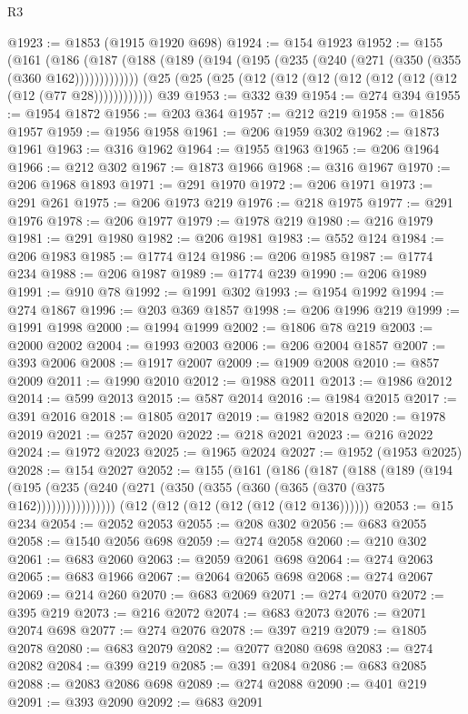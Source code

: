 \begin{lexlean}{R3}
\begin{coremodule}
@1923 := @1853 (@1915 @1920 @698)
@1924 := @154 @1923
@1952 := @155
    (@161 (@186 (@187 (@188 (@189 (@194 (@195 (@235 (@240 (@271 (@350 (@355 (@360 @162)))))))))))))
    (@25 (@25 (@25 (@12 (@12 (@12 (@12 (@12 (@12 (@12 (@12 (@77 @28))))))))))))
    @39
@1953 := @332 @39
@1954 := @274 @394
@1955 := @1954 @1872
@1956 := @203 @364
@1957 := @212 @219
@1958 := @1856 @1957
@1959 := @1956 @1958
@1961 := @206 @1959 @302
@1962 := @1873 @1961
@1963 := @316 @1962
@1964 := @1955 @1963
@1965 := @206 @1964
@1966 := @212 @302
@1967 := @1873 @1966
@1968 := @316 @1967
@1970 := @206 @1968 @1893
@1971 := @291 @1970
@1972 := @206 @1971
@1973 := @291 @261
@1975 := @206 @1973 @219
@1976 := @218 @1975
@1977 := @291 @1976
@1978 := @206 @1977
@1979 := @1978 @219
@1980 := @216 @1979
@1981 := @291 @1980
@1982 := @206 @1981
@1983 := @552 @124
@1984 := @206 @1983
@1985 := @1774 @124
@1986 := @206 @1985
@1987 := @1774 @234
@1988 := @206 @1987
@1989 := @1774 @239
@1990 := @206 @1989
@1991 := @910 @78
@1992 := @1991 @302
@1993 := @1954 @1992
@1994 := @274 @1867
@1996 := @203 @369 @1857
@1998 := @206 @1996 @219
@1999 := @1991 @1998
@2000 := @1994 @1999
@2002 := @1806 @78 @219
@2003 := @2000 @2002
@2004 := @1993 @2003
@2006 := @206 @2004 @1857
@2007 := @393 @2006
@2008 := @1917 @2007
@2009 := @1909 @2008
@2010 := @857 @2009
@2011 := @1990 @2010
@2012 := @1988 @2011
@2013 := @1986 @2012
@2014 := @599 @2013
@2015 := @587 @2014
@2016 := @1984 @2015
@2017 := @391 @2016
@2018 := @1805 @2017
@2019 := @1982 @2018
@2020 := @1978 @2019
@2021 := @257 @2020
@2022 := @218 @2021
@2023 := @216 @2022
@2024 := @1972 @2023
@2025 := @1965 @2024
@2027 := @1952 (@1953 @2025)
@2028 := @154 @2027
@2052 := @155
    (@161
      (@186
        (@187
          (@188
            (@189
              (@194 (@195 (@235 (@240 (@271 (@350 (@355 (@360 (@365 (@370 (@375 @162))))))))))))))))
    (@12 (@12 (@12 (@12 (@12 (@12 @136))))))
@2053 := @15 @234
@2054 := @2052 @2053
@2055 := @208 @302
@2056 := @683 @2055
@2058 := @1540 @2056 @698
@2059 := @274 @2058
@2060 := @210 @302
@2061 := @683 @2060
@2063 := @2059 @2061 @698
@2064 := @274 @2063
@2065 := @683 @1966
@2067 := @2064 @2065 @698
@2068 := @274 @2067
@2069 := @214 @260
@2070 := @683 @2069
@2071 := @274 @2070
@2072 := @395 @219
@2073 := @216 @2072
@2074 := @683 @2073
@2076 := @2071 @2074 @698
@2077 := @274 @2076
@2078 := @397 @219
@2079 := @1805 @2078
@2080 := @683 @2079
@2082 := @2077 @2080 @698
@2083 := @274 @2082
@2084 := @399 @219
@2085 := @391 @2084
@2086 := @683 @2085
@2088 := @2083 @2086 @698
@2089 := @274 @2088
@2090 := @401 @219
@2091 := @393 @2090
@2092 := @683 @2091

\end{coremodule}
\end{lexlean}
